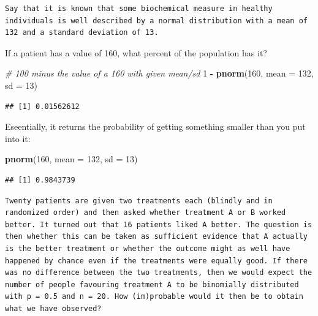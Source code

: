 \documentclass[]{article}
\newenvironment{Shaded}{\begin{snugshade}}{\end{snugshade}}
\newcommand{\KeywordTok}[1]{\textcolor[rgb]{0.13,0.29,0.53}{\textbf{#1}}}
\newcommand{\DataTypeTok}[1]{\textcolor[rgb]{0.13,0.29,0.53}{#1}}
\newcommand{\DecValTok}[1]{\textcolor[rgb]{0.00,0.00,0.81}{#1}}
\newcommand{\StringTok}[1]{\textcolor[rgb]{0.31,0.60,0.02}{#1}}
\newcommand{\CommentTok}[1]{\textcolor[rgb]{0.56,0.35,0.01}{\textit{#1}}}
\newcommand{\OperatorTok}[1]{\textcolor[rgb]{0.81,0.36,0.00}{\textbf{#1}}}
\newcommand{\NormalTok}[1]{#1}
\begin{document}
\begin{verbatim}
Say that it is known that some biochemical measure in healthy individuals is well described by a normal distribution with a mean of 132 and a standard deviation of 13.
\end{verbatim}

If a patient has a value of 160, what percent of the population has it?

\begin{Shaded}
\begin{Highlighting}[]
\CommentTok{# 100 minus the value of a 160 with given mean/sd}
\DecValTok{1} \OperatorTok{-}\StringTok{ }\KeywordTok{pnorm}\NormalTok{(}\DecValTok{160}\NormalTok{, }\DataTypeTok{mean =} \DecValTok{132}\NormalTok{, }\DataTypeTok{sd =} \DecValTok{13}\NormalTok{)}
\end{Highlighting}
\end{Shaded}

\begin{verbatim}
## [1] 0.01562612
\end{verbatim}

Eseentially, it returns the probability of getting something smaller
than you put into it:

\begin{Shaded}
\begin{Highlighting}[]
\KeywordTok{pnorm}\NormalTok{(}\DecValTok{160}\NormalTok{, }\DataTypeTok{mean =} \DecValTok{132}\NormalTok{, }\DataTypeTok{sd =} \DecValTok{13}\NormalTok{)}
\end{Highlighting}
\end{Shaded}

\begin{verbatim}
## [1] 0.9843739
\end{verbatim}

\begin{verbatim}
Twenty patients are given two treatments each (blindly and in randomized order) and then asked whether treatment A or B worked better. It turned out that 16 patients liked A better. The question is then whether this can be taken as sufficient evidence that A actually is the better treatment or whether the outcome might as well have happened by chance even if the treatments were equally good. If there was no difference between the two treatments, then we would expect the number of people favouring treatment A to be binomially distributed with p = 0.5 and n = 20. How (im)probable would it then be to obtain what we have observed?
\end{verbatim}
\end{document}
